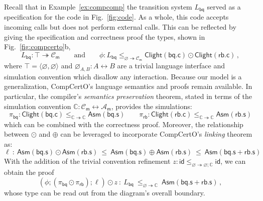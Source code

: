 \documentclass[acmsmall,screen,review,anonymous]{acmart}
\newcommand{\kw}[1]{\ensuremath{ \mathsf{#1} }}
\begin{document}
\begin{example} \label{ex:compcerto-sd} %

Recall that in Example~\ref{ex:compcomp}
the transition system $L_\kw{bq}$
served as a specification for the code in Fig.~\ref{fig:code}.
As a whole, this code
accepts incoming calls but does not perform external calls.
This can be reflected by giving the specification
and correctness proof
the types,
shown in Fig.~\ref{fig:compcerto}b,
\[
  L_\kw{bq} : \top \twoheadrightarrow \mathcal{C}_\kw{m}
  \qquad
  \text{and}
  \qquad
  \phi :
  L_\kw{bq} \le_{\varnothing \twoheadrightarrow \mathcal{C}_\kw{m}}
    \kw{Clight}(\kw{bq.c}) \odot \kw{Clight}(\kw{rb.c})
  \,,
\]
where $\top = \langle \varnothing, \varnothing \rangle$
and $\varnothing_{A,B} : A \leftrightarrow B$
are a trivial language interface and simulation convention
which disallow any interaction.
%
Because our model is a generalization,
CompCertO's
language semantics and proofs
remain available.
In particular,
the compiler's \emph{semantics preservation} theorem,
stated in terms of the simulation convention
$\mathbb{C} : \mathcal{C}_\kw{m} \leftrightarrow \mathcal{A}_\kw{m}$,
provides the simulations:
\[
  \pi_\kw{bq} :
    \kw{Clight}(\kw{bq.c})
    \le_{\mathbb{C} \twoheadrightarrow \mathbb{C}}
    \kw{Asm}(\kw{bq.s})
  \qquad
  \pi_\kw{rb} :
    \kw{Clight}(\kw{rb.c})
    \le_{\mathbb{C} \twoheadrightarrow \mathbb{C}}
    \kw{Asm}(\kw{rb.s})
\]
which can be combined with the correctness proof.
Moreover,
the relationship between $\odot$ and $\oplus$
can be leveraged to incorporate CompCertO's
\emph{linking} theorem as:
\[
  \ell \::\:
  \kw{Asm}(\kw{bq.s}) \odot \kw{Asm}(\kw{rb.s}) \:\le\:
  \kw{Asm}(\kw{bq.s}) \oplus \kw{Asm}(\kw{rb.s}) \:\le\:
  \kw{Asm}(\kw{bq.s + rb.s})
\]
With the addition of the trivial convention refinement
$z : \kw{id}
     \le_{\varnothing \twoheadrightarrow \varnothing \mathbin; \mathbb{C}}
     \kw{id}$,
we can obtain the proof
\[
  (\phi \mathbin; (\pi_\kw{bq} \odot \pi_\kw{rb}) \mathbin; \ell) \odot z
  \::\:
  L_\kw{bq}
  \:\le_{\varnothing \twoheadrightarrow \mathbb{C}}\:
  \kw{Asm}(\kw{bq.s + rb.s})
  \,,
\]
whose type can be read out from the diagram's overall boundary.


\end{example}
\end{document}

